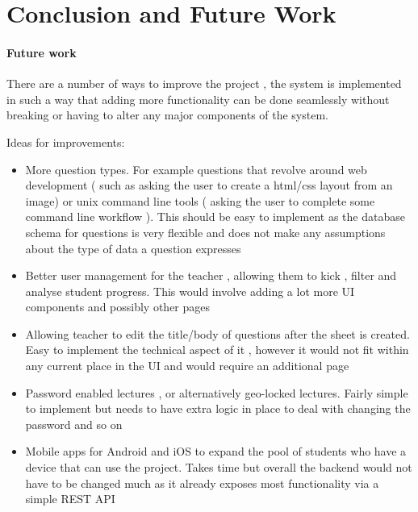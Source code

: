 \chapter{Conclusion and Future Work}

\subsubsection{Future work}
There are a number of ways to improve the project , the system is implemented in such a way that adding more functionality can be done seamlessly without breaking or having to alter any major components of the system.

Ideas for improvements:
\begin{itemize}
	\item More question types. For example questions that revolve around web development ( such as asking the user to create a html/css layout from an image) or unix command line tools ( asking the user to complete some command line workflow ). This should be easy to implement as the database schema for questions is very flexible and does not make any assumptions about the type of data a question expresses
	\item Better user management for the teacher , allowing them to kick , filter and analyse student progress. This would involve adding a lot more UI components and possibly other pages
	\item Allowing teacher to edit the title/body of questions after the sheet is created. Easy to implement the technical aspect of it , however it would not fit within any current place in the UI and would require an additional page
	\item Password enabled lectures , or alternatively geo-locked lectures. Fairly simple to implement but needs to have extra logic in place to deal with changing the password and so on
	\item Mobile apps for Android and iOS to expand the pool of students who have a device that can use the project. Takes time but overall the backend would not have to be changed much as it already exposes most functionality via a simple REST API
\end{itemize}
